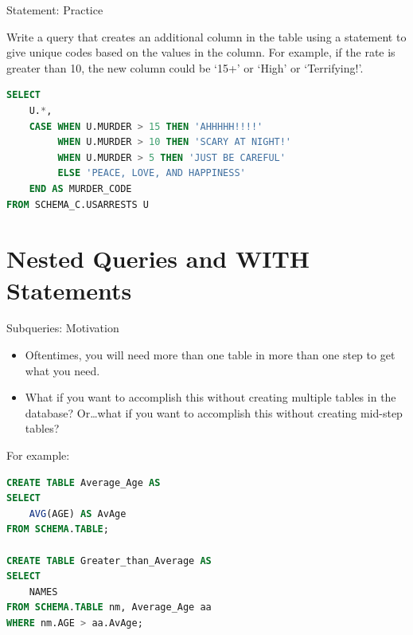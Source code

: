 \documentclass{beamer}
\begin{document}
\begin{frame}[fragile]{ Statement: Practice}
\begin{prob}\small
Write a query that creates an additional column in the  table
using a  statement to give unique codes based on the values in the 
column. For example, if the  rate is greater than 10, the new column could be
`15+' or `High' or `Terrifying!'.
\end{prob}
\pause
\textbf{}
\begin{lstlisting}[language=SQL]
SELECT
    U.*,
    CASE WHEN U.MURDER > 15 THEN 'AHHHHH!!!!'
         WHEN U.MURDER > 10 THEN 'SCARY AT NIGHT!'
         WHEN U.MURDER > 5 THEN 'JUST BE CAREFUL'
         ELSE 'PEACE, LOVE, AND HAPPINESS'
    END AS MURDER_CODE
FROM SCHEMA_C.USARRESTS U
\end{lstlisting}
\end{frame}

\section{Nested Queries and WITH Statements}

\sectionframe

\begin{frame}[fragile]{Subqueries: Motivation}
\begin{itemize}\small
  \item Oftentimes, you will need more than one table in more than one step to get what you need.
  \item What if you want to accomplish this without creating multiple tables in the
        database? Or\dots what if you want to accomplish this without creating mid-step tables?
\end{itemize}
For example:
\begin{lstlisting}[language=SQL]
CREATE TABLE Average_Age AS
SELECT
    AVG(AGE) AS AvAge
FROM SCHEMA.TABLE;

CREATE TABLE Greater_than_Average AS
SELECT
    NAMES
FROM SCHEMA.TABLE nm, Average_Age aa
WHERE nm.AGE > aa.AvAge;
\end{lstlisting}
\end{frame}
\end{document}
